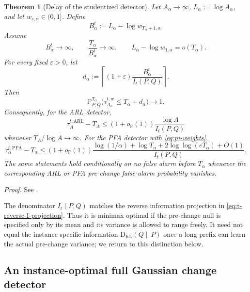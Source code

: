 \documentclass[12pt]{article}
\theoremstyle{spaced}
\newtheorem{theorem}{Theorem}[section]
\theoremstyle{remark}
\newcommand{\bbP}{\mathbb P}
\newcommand{\KL}{\mathrm{D}_{\text{KL}}}
\begin{document}
\begin{theorem}[Delay of the studentized detector]
\label{thm:t-delay-unified}
Let $A_\alpha\to\infty$, $L_\alpha:=\log A_\alpha$, and let
$w_{s,\alpha}\in(0,1]$.  Define
\begin{equation}
\label{eq:t-effective-boundary}
  B_\alpha^t
  :=L_\alpha-\log w_{T_\alpha+1,\alpha}.
\end{equation}
Assume
\begin{equation}
\label{eq:t-late-change-condition}
  B_\alpha^t\to\infty,
  \qquad
  \frac{T_\alpha}{B_\alpha^t}\to\infty,
  \qquad
  L_\alpha-\log w_{1,\alpha}=o(T_\alpha).
\end{equation}
For every fixed $\varepsilon>0$, let
\[
  d_\alpha
  :=\left\lceil
       (1+\varepsilon)
       \frac{B_\alpha^t}{I_t(P,Q)}
     \right\rceil.
\]
Then
\begin{equation}
\label{eq:t-delay-hp}
  \bbP_{P,Q}^{T_\alpha}
  \bigl(\tau_{A_\alpha}^{t,w}\le T_\alpha+d_\alpha\bigr)
  \longrightarrow1.
\end{equation}
Consequently, for the ARL detector,
\[
  \tau_A^{t,\mathrm{ARL}}-T_A
  \le
  (1+o_{\bbP}(1))\frac{\log A}{I_t(P,Q)}
\]
whenever $T_A/\log A\to\infty$.  For the PFA detector with
\eqref{eq:pi-weights},
\begin{equation}
\label{eq:t-PFA-delay}
  \tau_\alpha^{t,\mathrm{PFA}}-T_\alpha
  \le
  (1+o_{\bbP}(1))
  \frac{\log(1/\alpha)+\log T_\alpha
        +2\log\log(eT_\alpha)+O(1)}{I_t(P,Q)}.
\end{equation}
The same statements hold conditionally on no false alarm before $T_\alpha$
whenever the corresponding ARL or PFA pre-change false-alarm probability
vanishes.
\end{theorem}
\emph{Proof.} See .

The denominator $I_t(P,Q)$ matches the reverse information projection in
\eqref{eq:t-reverse-I-projection}.  Thus it is minimax optimal if the
pre-change null is specified only by its mean and its variance is allowed to
range freely.  It need not equal the instance-specific information
$\KL(Q\|P)$ once a long prefix can learn the actual pre-change variance; we
return to this distinction below.




\subsection{An instance-optimal full Gaussian change detector}
\end{document}
